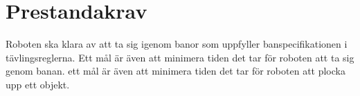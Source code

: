 \section{Prestandakrav}
Roboten ska klara av att ta sig igenom banor som uppfyller banspecifikationen i tävlingsreglerna.
Ett mål är även att minimera tiden det tar för roboten att ta sig genom banan.
ett mål är även att minimera tiden det tar för roboten att plocka upp ett objekt.